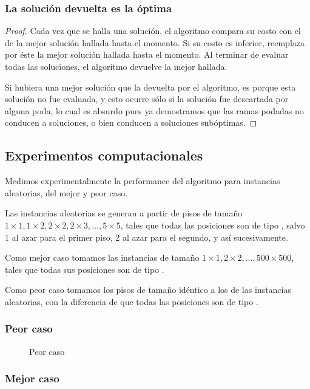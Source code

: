 \documentclass[a4paper, 10pt, twoside]{article}
\begin{document}
\subsubsection{La solución devuelta es la óptima}

\begin{proof}
    Cada vez que se halla una solución, el algoritmo compara su costo con el de la mejor solución hallada hasta el momento. Si su costo es inferior, reemplaza por éste la mejor solución hallada hasta el momento. Al terminar de evaluar todas las soluciones, el algoritmo devuelve la mejor hallada.

    Si hubiera una mejor solución que la devuelta por el algoritmo, es porque esta solución no fue evaluada, y esto ocurre sólo si la solución fue descartada por alguna poda, lo cual es absurdo pues ya demostramos que las ramas podadas no conducen a soluciones, o bien conducen a soluciones subóptimas.
\end{proof}


\subsection{Experimentos computacionales}

Medimos experimentalmente la performance del algoritmo para instancias aleatorias, del mejor y peor caso.

Las instancias aleatorias se generan a partir de pisos de tamaño $1 \times 1, 1 \times 2, 2 \times 2, 2 \times 3, \ldots, 5 \times 5$, tales que todas las posiciones son de tipo \Pared, salvo 1 al azar para el primer piso, 2 al azar para el segundo, y así sucesivamente.

Como mejor caso tomamos las instancias de tamaño $1 \times 1, 2 \times 2, \ldots, 500 \times 500$, tales que todas sus posiciones son de tipo \Pared.

Como peor caso tomamos los pisos de tamaño idéntico a los de las instancias aleatorias, con la diferencia de que todas las posiciones son de tipo \Libre.


\subsubsection{Peor caso}

\begin{figure}[H]
  \centering
  
  \caption{Peor caso}
\end{figure}


\subsubsection{Mejor caso}
\end{document}
